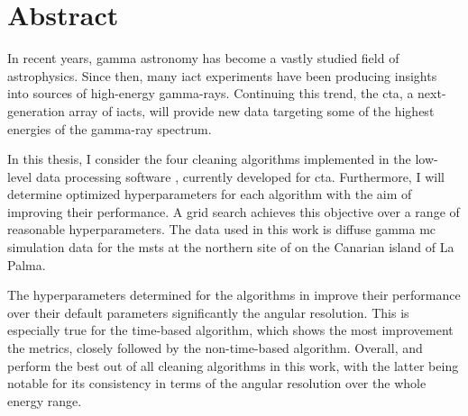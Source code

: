 \thispagestyle{plain}

\section*{Abstract}
In recent years, gamma astronomy has become a vastly studied field of astrophysics.
Since then, many \gls{iact} experiments have been producing insights into sources of
high-energy gamma-rays. Continuing this trend, the \gls{cta}, a next-generation array of \glspl{iact},
will provide new data targeting some of the highest energies of the gamma-ray spectrum.

In this thesis, I consider the four cleaning algorithms implemented in the low-level data processing software \ctapipe{},
currently developed for \gls{cta}. Furthermore, I will determine optimized hyperparameters for each algorithm
with the aim of improving their performance. A grid search achieves this objective
over a range of reasonable hyperparameters. The data used in this work is diffuse gamma \gls{mc} simulation data for
the \glspl{mst} at the northern site of \cta{} on the Canarian island of La Palma.

The hyperparameters determined for the algorithms in \ctapipe{} improve their performance over
their default parameters significantly \wrt the angular resolution. This is especially true for the
time-based \tcc{} algorithm, which shows the most improvement \wrt the metrics, closely followed by the
non-time-based \mars{} algorithm. Overall, \fact{} and \mars{} perform the best out of all cleaning algorithms in this work,
with the latter being notable for its consistency in terms of the angular resolution over the whole energy range.


